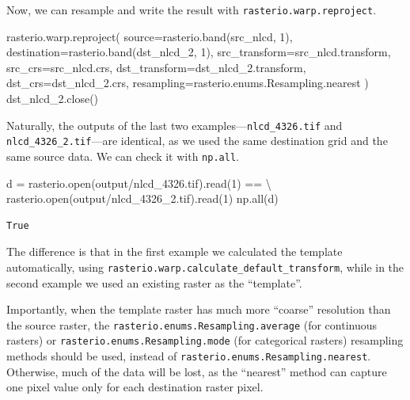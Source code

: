 \documentclass[
  letterpaper,
]{krantz}
\newenvironment{Shaded}{\begin{snugshade}}{\end{snugshade}}
\newcommand{\BuiltInTok}[1]{\textcolor[rgb]{0.00,0.23,0.31}{#1}}
\newcommand{\DecValTok}[1]{\textcolor[rgb]{0.68,0.00,0.00}{#1}}
\newcommand{\NormalTok}[1]{\textcolor[rgb]{0.00,0.23,0.31}{#1}}
\newcommand{\OperatorTok}[1]{\textcolor[rgb]{0.37,0.37,0.37}{#1}}
\newcommand{\StringTok}[1]{\textcolor[rgb]{0.13,0.47,0.30}{#1}}
\begin{document}
Now, we can resample and write the result with
\texttt{rasterio.warp.reproject}.

\begin{Shaded}
\begin{Highlighting}[]
\NormalTok{rasterio.warp.reproject(}
\NormalTok{    source}\OperatorTok{=}\NormalTok{rasterio.band(src\_nlcd, }\DecValTok{1}\NormalTok{),}
\NormalTok{    destination}\OperatorTok{=}\NormalTok{rasterio.band(dst\_nlcd\_2, }\DecValTok{1}\NormalTok{),}
\NormalTok{    src\_transform}\OperatorTok{=}\NormalTok{src\_nlcd.transform,}
\NormalTok{    src\_crs}\OperatorTok{=}\NormalTok{src\_nlcd.crs,}
\NormalTok{    dst\_transform}\OperatorTok{=}\NormalTok{dst\_nlcd\_2.transform,}
\NormalTok{    dst\_crs}\OperatorTok{=}\NormalTok{dst\_nlcd\_2.crs,}
\NormalTok{    resampling}\OperatorTok{=}\NormalTok{rasterio.enums.Resampling.nearest}
\NormalTok{)}
\NormalTok{dst\_nlcd\_2.close()}
\end{Highlighting}
\end{Shaded}

Naturally, the outputs of the last two
examples---\texttt{nlcd\_4326.tif} and \texttt{nlcd\_4326\_2.tif}---are
identical, as we used the same destination grid and the same source
data. We can check it with \texttt{np.all}.

\begin{Shaded}
\begin{Highlighting}[]
\NormalTok{d }\OperatorTok{=}\NormalTok{ rasterio.}\BuiltInTok{open}\NormalTok{(}\StringTok{\textquotesingle{}output/nlcd\_4326.tif\textquotesingle{}}\NormalTok{).read(}\DecValTok{1}\NormalTok{) }\OperatorTok{==} \OperatorTok{\textbackslash{}}
\NormalTok{    rasterio.}\BuiltInTok{open}\NormalTok{(}\StringTok{\textquotesingle{}output/nlcd\_4326\_2.tif\textquotesingle{}}\NormalTok{).read(}\DecValTok{1}\NormalTok{)}
\NormalTok{np.}\BuiltInTok{all}\NormalTok{(d)}
\end{Highlighting}
\end{Shaded}

\begin{verbatim}
True
\end{verbatim}

The difference is that in the first example we calculated the template
automatically, using
\texttt{rasterio.warp.calculate\_default\_transform}, while in the
second example we used an existing raster as the ``template''.

Importantly, when the template raster has much more ``coarse''
resolution than the source raster, the
\texttt{rasterio.enums.Resampling.average} (for continuous rasters) or
\texttt{rasterio.enums.Resampling.mode} (for categorical rasters)
resampling methods should be used, instead of
\texttt{rasterio.enums.Resampling.nearest}. Otherwise, much of the data
will be lost, as the ``nearest'' method can capture one pixel value only
for each destination raster pixel.
\end{document}
